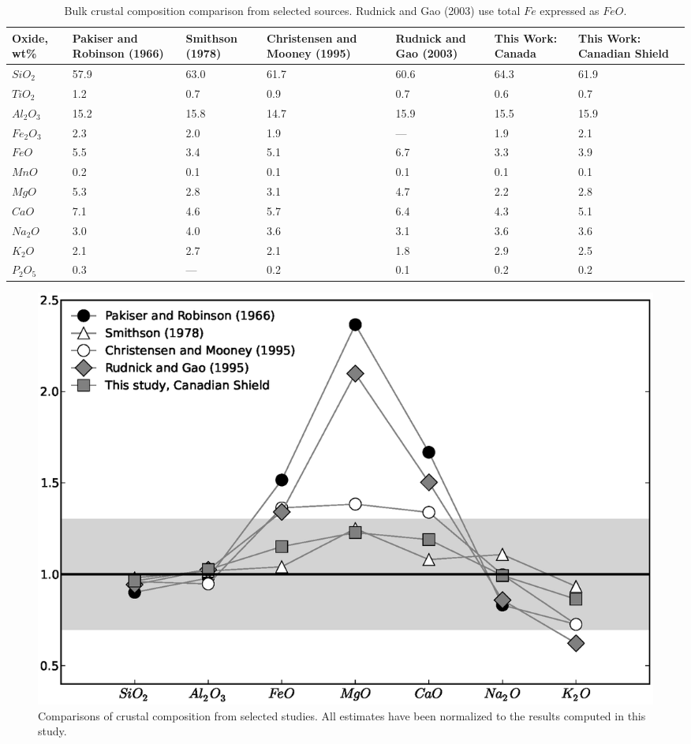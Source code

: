 \documentclass[review]{elsarticle}
\begin{document}
\begin{table}
  \begin{tabular}{ p{2cm} p{2cm} p{2cm} p{2cm} p{2cm} p{2cm} p{2cm}}
    \hline
    Oxide, wt\% & Pakiser and Robinson (1966) & Smithson (1978) & Christensen and Mooney (1995) & Rudnick and Gao (2003) & This Work: Canada & This Work: Canadian Shield\\
    \hline
    $SiO_2$ & 57.9 & 63.0 & 61.7 & 60.6 & 64.3 & 61.9 \\
    $TiO_2$ & 1.2 & 0.7 & 0.9 & 0.7 & 0.6 & 0.7 \\
    $Al_2O_3$ & 15.2 & 15.8 & 14.7 & 15.9 & 15.5 & 15.9 \\
    $Fe_2O_3$ & 2.3 & 2.0 & 1.9 & --- & 1.9 & 2.1 \\
    $FeO$ & 5.5 & 3.4 & 5.1 & 6.7 & 3.3 & 3.9 \\
    $MnO$ & 0.2 & 0.1 & 0.1 & 0.1 & 0.1 & 0.1 \\
    $MgO$ & 5.3 & 2.8 & 3.1 & 4.7 & 2.2 & 2.8 \\
    $CaO$ & 7.1 & 4.6 & 5.7 & 6.4 & 4.3 & 5.1 \\
    $Na_2O$ & 3.0 & 4.0 & 3.6 & 3.1 & 3.6 & 3.6 \\
    $K_2O$ & 2.1 & 2.7 & 2.1 & 1.8 & 2.9 & 2.5 \\
    $P_2O_5$ & 0.3 & --- & 0.2 & 0.1 & 0.2 & 0.2 \\
    \hline
  \end{tabular}
  \caption{Bulk crustal composition comparison from selected sources. Rudnick and Gao (2003) use total $Fe$ expressed as $FeO$.}
\label{table:composition}

\end{table}

\begin{figure}
  \centering
  \includegraphics[width=\textwidth]{composition.eps}
  \caption{Comparisons of crustal composition from selected studies. All estimates have been normalized to the results computed in this study.}
  \label{fig:composition}
\end{figure}
\end{document}
